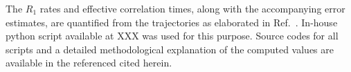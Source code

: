 \documentclass[journal=jacsat,manuscript=article,layout=singlecolumn]{achemso}
\begin{document}
The $R_{1}$ rates and effective correlation times, along with the accompanying error estimates, are quantified from the trajectories as elaborated in Ref.~. In-house python script available at XXX was used for this purpose. Source codes for all scripts and a detailed methodological explanation of the computed values are available in the referenced cited herein.

\end{document}
